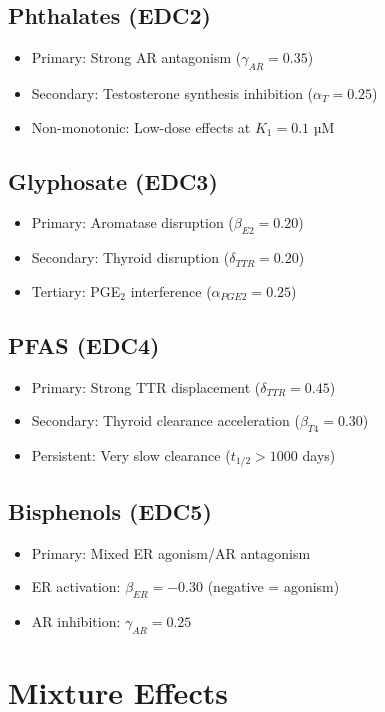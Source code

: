 \documentclass[11pt]{article}
\begin{document}
\subsection{Phthalates (EDC2)}
\begin{itemize}
\item Primary: Strong AR antagonism ($\gamma_{AR} = 0.35$)
\item Secondary: Testosterone synthesis inhibition ($\alpha_T = 0.25$)
\item Non-monotonic: Low-dose effects at $K_1 = 0.1$ µM
\end{itemize}

\subsection{Glyphosate (EDC3)}
\begin{itemize}
\item Primary: Aromatase disruption ($\beta_{E2} = 0.20$)
\item Secondary: Thyroid disruption ($\delta_{TTR} = 0.20$)
\item Tertiary: PGE$_2$ interference ($\alpha_{PGE2} = 0.25$)
\end{itemize}

\subsection{PFAS (EDC4)}
\begin{itemize}
\item Primary: Strong TTR displacement ($\delta_{TTR} = 0.45$)
\item Secondary: Thyroid clearance acceleration ($\beta_{T4} = 0.30$)
\item Persistent: Very slow clearance ($t_{1/2} > 1000$ days)
\end{itemize}

\subsection{Bisphenols (EDC5)}
\begin{itemize}
\item Primary: Mixed ER agonism/AR antagonism
\item ER activation: $\beta_{ER} = -0.30$ (negative = agonism)
\item AR inhibition: $\gamma_{AR} = 0.25$
\end{itemize}

\section{Mixture Effects}
\end{document}
